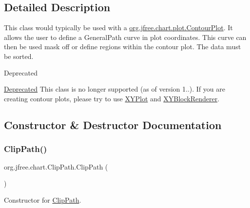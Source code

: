 \subsection{Detailed Description}
This class would typically be used with a \mbox{\hyperlink{classorg_1_1jfree_1_1chart_1_1plot_1_1_contour_plot}{org.\+jfree.\+chart.\+plot.\+Contour\+Plot}}. It allows the user to define a {\ttfamily General\+Path} curve in plot coordinates. This curve can then be used mask off or define regions within the contour plot. The data must be sorted.

\begin{DoxyRefDesc}{Deprecated}
\item[\mbox{\hyperlink{deprecated__deprecated000033}{Deprecated}}]This class is no longer supported (as of version 1..). If you are creating contour plots, please try to use \mbox{\hyperlink{}{X\+Y\+Plot}} and \mbox{\hyperlink{}{X\+Y\+Block\+Renderer}}. \end{DoxyRefDesc}


\subsection{Constructor \& Destructor Documentation}
\mbox{\label{classorg_1_1jfree_1_1chart_1_1_clip_path_a1b1d732b206663a189a5941af816c89c}} 
\subsubsection{\texorpdfstring{Clip\+Path()}{ClipPath()}\hspace{0.1cm}{\footnotesize\ttfamily [1/4]}}
{\footnotesize\ttfamily org.\+jfree.\+chart.\+Clip\+Path.\+Clip\+Path (\begin{DoxyParamCaption}{ }\end{DoxyParamCaption})}

Constructor for \mbox{\hyperlink{classorg_1_1jfree_1_1chart_1_1_clip_path}{Clip\+Path}}. \mbox{\label{classorg_1_1jfree_1_1chart_1_1_clip_path_ab29d997fea052d7f2c7bb8af27e0fbaa}} 
